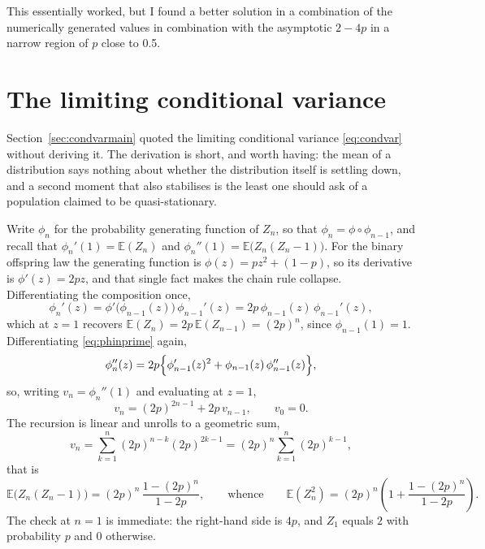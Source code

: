 \documentclass[11pt]{article}
\begin{document}
\noindent
This essentially worked, but I found a better solution in a combination of the numerically generated values in combination with the asymptotic $2-4p$ in a narrow region of $p$ close to 0.5.



\section{The limiting conditional variance}
\label{app:condvar}

Section~\ref{sec:condvarmain} quoted the limiting conditional variance \eqref{eq:condvar} without deriving it. The derivation is short, and worth having: the mean of a distribution says nothing about whether the distribution itself is settling down, and a second moment that also stabilises is the least one should ask of a population claimed to be quasi-stationary.

Write $\phi_n$ for the probability generating function of $Z_n$, so that $\phi_n=\phi\circ\phi_{n-1}$, and recall that $\phi_n'(1)=\mathbb{E}(Z_n)$ and $\phi_n''(1)=\mathbb{E}\bigl(Z_n(Z_n-1)\bigr)$. For the binary offspring law the generating function is $\phi(z)=pz^2+(1-p)$, so its derivative is $\phi'(z)=2pz$, and that single fact makes the chain rule collapse. Differentiating the composition once,
\begin{equation}
\label{eq:phinprime}
\phi_n'(z) = \phi'\bigl(\phi_{n-1}(z)\bigr)\,\phi_{n-1}'(z)
= 2p\,\phi_{n-1}(z)\,\phi_{n-1}'(z),
\end{equation}
which at $z=1$ recovers $\mathbb{E}(Z_n)=2p\,\mathbb{E}(Z_{n-1})=(2p)^n$, since $\phi_{n-1}(1)=1$. Differentiating \eqref{eq:phinprime} again,
\begin{equation}
\label{eq:phinsecond}
\phi_n''(z)
= 2p\Bigl\{\phi_{n-1}'(z)^2 + \phi_{n-1}(z)\,\phi_{n-1}''(z)\Bigr\},
\end{equation}
so, writing $v_n=\phi_n''(1)$ and evaluating at $z=1$,
\begin{equation}
\label{eq:vnrecursion}
v_n = (2p)^{2n-1} + 2p\,v_{n-1},
\qquad v_0 = 0 .
\end{equation}
The recursion is linear and unrolls to a geometric sum,
\[
v_n=\sum_{k=1}^{n}(2p)^{n-k}(2p)^{2k-1}
=(2p)^n\sum_{k=1}^{n}(2p)^{k-1},
\]
that is
\begin{equation}
\label{eq:factorialmoment}
\mathbb{E}\bigl(Z_n(Z_n-1)\bigr) = (2p)^n\,\frac{1-(2p)^n}{1-2p},
\qquad\text{whence}\qquad
\mathbb{E}(Z_n^2) = (2p)^n\left(1+\frac{1-(2p)^n}{1-2p}\right).
\end{equation}
The check at $n=1$ is immediate: the right-hand side is $4p$, and $Z_1$ equals $2$ with probability $p$ and $0$ otherwise.
\end{document}
